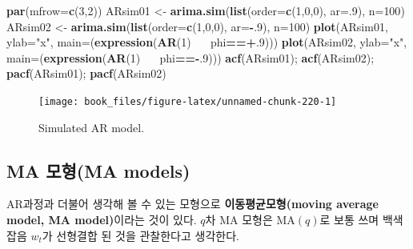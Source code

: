 \documentclass[b5paper,]{scrbook}
\makeatletter
\newenvironment{Shaded}{\begin{snugshade}}{\end{snugshade}}
\newcommand{\DataTypeTok}[1]{\textcolor[rgb]{0.13,0.29,0.53}{#1}}
\newcommand{\DecValTok}[1]{\textcolor[rgb]{0.00,0.00,0.81}{#1}}
\newcommand{\ErrorTok}[1]{\textcolor[rgb]{0.64,0.00,0.00}{\textbf{#1}}}
\newcommand{\KeywordTok}[1]{\textcolor[rgb]{0.13,0.29,0.53}{\textbf{#1}}}
\newcommand{\NormalTok}[1]{#1}
\newcommand{\OperatorTok}[1]{\textcolor[rgb]{0.81,0.36,0.00}{\textbf{#1}}}
\newcommand{\StringTok}[1]{\textcolor[rgb]{0.31,0.60,0.02}{#1}}
\theoremstyle{plain}
\theoremstyle{definition}
\numberwithin{equation}{section}
\newenvironment{kframe}{%
\medskip{}
\setlength{\fboxsep}{.8em}
 \def\at@end@of@kframe{}%
 \ifinner\ifhmode%
  \def\at@end@of@kframe{\end{minipage}}%
  \begin{minipage}{\columnwidth}%
 \fi\fi%
 \def\FrameCommand##1{\hskip\@totalleftmargin \hskip-\fboxsep
 \colorbox{shadecolor}{##1}\hskip-\fboxsep
     \hskip-\linewidth \hskip-\@totalleftmargin \hskip\columnwidth}%
 \MakeFramed {\advance\hsize-\width
   \@totalleftmargin\z@ \linewidth\hsize
   \@setminipage}}%
 {\par\unskip\endMakeFramed%
 \at@end@of@kframe}
\renewenvironment{Shaded}{\begin{kframe}}{\end{kframe}}
\makeatother
\begin{document}
\begin{Shaded}
\begin{Highlighting}[]
\KeywordTok{par}\NormalTok{(}\DataTypeTok{mfrow=}\KeywordTok{c}\NormalTok{(}\DecValTok{3}\NormalTok{,}\DecValTok{2}\NormalTok{))}
\NormalTok{ARsim01 <-}\StringTok{ }\KeywordTok{arima.sim}\NormalTok{(}\KeywordTok{list}\NormalTok{(}\DataTypeTok{order=}\KeywordTok{c}\NormalTok{(}\DecValTok{1}\NormalTok{,}\DecValTok{0}\NormalTok{,}\DecValTok{0}\NormalTok{), }\DataTypeTok{ar=}\NormalTok{.}\DecValTok{9}\NormalTok{), }\DataTypeTok{n=}\DecValTok{100}\NormalTok{)}
\NormalTok{ARsim02 <-}\StringTok{ }\KeywordTok{arima.sim}\NormalTok{(}\KeywordTok{list}\NormalTok{(}\DataTypeTok{order=}\KeywordTok{c}\NormalTok{(}\DecValTok{1}\NormalTok{,}\DecValTok{0}\NormalTok{,}\DecValTok{0}\NormalTok{), }\DataTypeTok{ar=}\OperatorTok{-}\NormalTok{.}\DecValTok{9}\NormalTok{), }\DataTypeTok{n=}\DecValTok{100}\NormalTok{)}
\KeywordTok{plot}\NormalTok{(ARsim01, }\DataTypeTok{ylab=}\StringTok{"x"}\NormalTok{, }\DataTypeTok{main=}\NormalTok{(}\KeywordTok{expression}\NormalTok{(}\KeywordTok{AR}\NormalTok{(}\DecValTok{1}\NormalTok{)}\OperatorTok{~}\ErrorTok{~~}\NormalTok{phi}\OperatorTok{==+}\NormalTok{.}\DecValTok{9}\NormalTok{)))}
\KeywordTok{plot}\NormalTok{(ARsim02, }\DataTypeTok{ylab=}\StringTok{"x"}\NormalTok{, }\DataTypeTok{main=}\NormalTok{(}\KeywordTok{expression}\NormalTok{(}\KeywordTok{AR}\NormalTok{(}\DecValTok{1}\NormalTok{)}\OperatorTok{~}\ErrorTok{~~}\NormalTok{phi}\OperatorTok{==-}\NormalTok{.}\DecValTok{9}\NormalTok{)))}
\KeywordTok{acf}\NormalTok{(ARsim01); }\KeywordTok{acf}\NormalTok{(ARsim02); }\KeywordTok{pacf}\NormalTok{(ARsim01); }\KeywordTok{pacf}\NormalTok{(ARsim02)}
\end{Highlighting}
\end{Shaded}

\begin{figure}

{\centering \texttt{[image: book\_files/figure-latex/unnamed-chunk-220-1]} 

}

\caption{Simulated AR model.}\label{fig:unnamed-chunk-220}
\end{figure}

\hypertarget{ma-ma-models}{%
\subsection{MA 모형(MA models)}\label{ma-ma-models}}

AR과정과 더불어 생각해 볼 수 있는 모형으로 \textbf{이동평균모형(moving average model, MA model)}이라는 것이 있다. \(q\)차 MA 모형은 \(\text{MA}(q)\)로 보통 쓰며 백색 잡음 \(w_{t}\)가 선형결합 된 것을 관찰한다고 생각한다.
\end{document}
